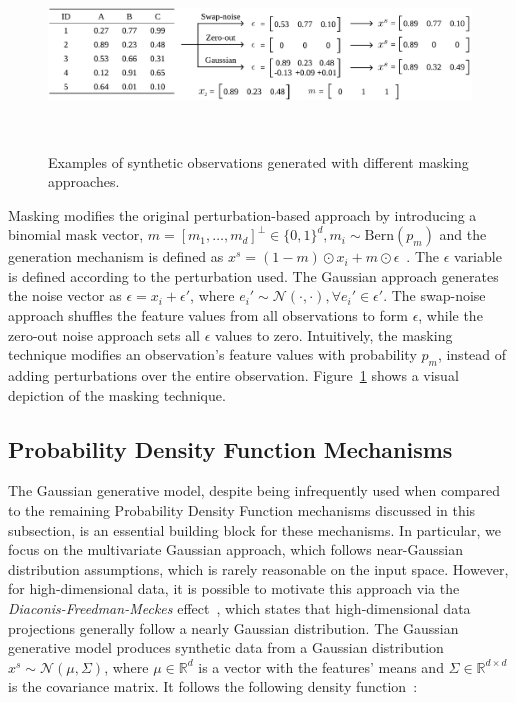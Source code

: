 \begin{figure}
	\centering
	\includegraphics[width=.95\linewidth]{../analysis/masking-example}
    \caption{Examples of synthetic observations generated with different
        masking approaches.
    }~\label{fig:masking-example}
\end{figure}

Masking modifies the original perturbation-based approach by introducing a
binomial mask vector, $m = [m_1, \ldots, m_d]^\bot \in \{0,1\}^d, m_i \sim
\text{Bern}(p_m)$ and the generation mechanism is defined as $x^s = (1 -
m)\odot x_i + m \odot \epsilon$~\cite{yoon2020vime}. The $\epsilon$ variable
is defined according to the perturbation used. The Gaussian approach generates
the noise vector as $\epsilon = x_i + \epsilon'$, where $e_i' \sim
\mathcal{N}(\cdot, \cdot), \forall e_i' \in \epsilon'$. The swap-noise
approach shuffles the feature values from all observations to form
$\epsilon$, while the zero-out noise approach sets all $\epsilon$ values to
zero. Intuitively, the masking technique modifies an observation's feature
values with probability $p_m$, instead of adding perturbations over the
entire observation. Figure~\ref{fig:masking-example} shows a visual depiction
of the masking technique.

\subsection{Probability Density Function Mechanisms}

The Gaussian generative model, despite being infrequently used when compared to the
remaining Probability Density Function mechanisms discussed in this subsection,
is an essential building block for these mechanisms. In particular, we focus
on the multivariate Gaussian approach, which follows near-Gaussian
distribution assumptions, which is rarely reasonable on the input space.
However, for high-dimensional data, it is possible to motivate this approach
via the \textit{Diaconis-Freedman-Meckes} effect~\cite{meckes2012projections},
which states that high-dimensional data projections generally follow a nearly
Gaussian distribution. The Gaussian generative model produces synthetic data
from a Gaussian distribution $x^s \sim \mathcal{N}(\mu, \Sigma)$, where $\mu
\in \mathbb{R}^d$ is a vector with the features' means and $\Sigma \in
\mathbb{R}^{d \times d}$ is the covariance matrix. It follows the following
density function~\cite{chanyaswad2019ron}:

